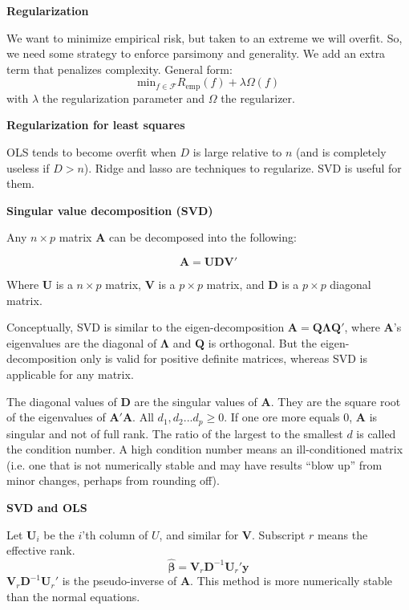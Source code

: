 \documentclass{minimal}
\begin{document}
\textbf{Regularization}

We want to minimize empirical risk, but taken to an extreme we will overfit. So,
we need some strategy to enforce parsimony and generality. We add an extra term
that penalizes complexity. General form:
$$
\mathrm{min}_{f \in \mathcal{F}}R_{\mathrm{emp}}(f) + \lambda \Omega (f)
$$
with $\lambda$ the regularization parameter and $\Omega$ the regularizer.

\medskip

\textbf{Regularization for least squares}

OLS tends to become overfit when $D$ is large relative to $n$ (and is completely
useless if $D>n$). Ridge and lasso are techniques to regularize. SVD is useful
for them.

\medskip

\textbf{Singular value decomposition (SVD)}

Any $n \times p$ matrix $\mathbf{A}$ can be decomposed into the following:

$$
\mathbf{A} = \mathbf{UDV}'
$$

Where $\mathbf{U}$ is a $n \times p$  matrix, $\mathbf{V}$ is a $p \times p$
matrix, and $\mathbf{D}$ is a $p \times p$ diagonal matrix.

Conceptually, SVD is similar to the eigen-decomposition
$\mathbf{A}=\mathbf{Q\Lambda Q}' $, where $\mathbf{A}$'s eigenvalues are the
diagonal of $\mathbf{\Lambda}$ and $\mathbf{Q}$ is orthogonal. But the
eigen-decomposition only is valid for positive definite matrices, whereas SVD is
applicable for any matrix. 

The diagonal values of $\mathbf{D}$ are the singular values of $\mathbf{A}$.
They are the square root of the eigenvalues of $\mathbf{A}'\mathbf{A}$. All
$d_1, d_2...d_p \geq 0$. If one ore more equals 0, $\mathbf{A}$ is singular and
not of full rank. The
ratio of the largest to the smallest $d$ is called the condition number. A high
condition number means an ill-conditioned matrix (i.e. one that is not
numerically stable and may have results ``blow up'' from minor changes, perhaps
from rounding off).

\medskip

\textbf{SVD and OLS}

Let $\mathbf{U}_i$ be the $i$'th column of $U$, and similar for $\mathbf{V}$.
Subscript $r$ means the effective rank.
$$
\hat{\mathbf{\beta}} = \mathbf{V}_r\mathbf{D}^{-1}\mathbf{U}_r'\mathbf{y}
$$
$\mathbf{V}_r\mathbf{D}^{-1}\mathbf{U}_r'$ is the pseudo-inverse of
$\mathbf{A}$. This method is more numerically stable than the normal
equations.
\end{document}
